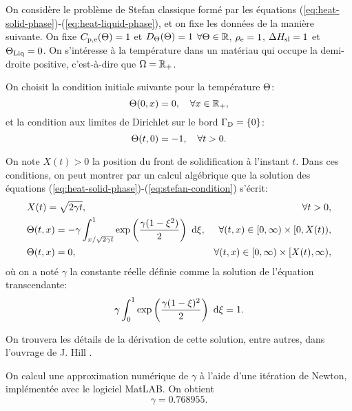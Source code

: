 On considère le problème de Stefan classique formé par les équations
(\ref{eq:heat-solid-phase})-(\ref{eq:heat-liquid-phase}), et on fixe
les données de la manière suivante. On fixe
$C_{\mathrm{p,e}}(\Theta) = 1$ et
$D_\Theta(\Theta)=1$ $\forall\Theta \in \mathbb
R$, $\rho_\mathrm{e} = 1$, $\Delta H_\mathrm{sl} = 1$ et $\Theta_\text{Liq} =
0$. On s'intéresse à la température dans un matériau qui occupe la
demi-droite positive, c'est-à-dire que $\Omega = \mathbb R_+$.

On choisit la condition initiale suivante pour la température
$\Theta$:
\begin{equation}
  \Theta(0, x) = 0, \quad \forall x\in\mathbb R_+,
\end{equation}
et la condition aux limites de Dirichlet sur le bord $\Gamma_\mathrm{D} =
\left\{ 0 \right\}$:
\begin{equation}
  \Theta(t, 0) = -1, \quad \forall t > 0.
\end{equation}

On note $X(t) > 0$ la position du front de solidification à l'instant
$t$. Dans ces conditions, on peut montrer \cite{HillStefanProblems}
par un calcul algébrique que la solution des équations
(\ref{eq:heat-solid-phase})-(\ref{eq:stefan-condition}) s'écrit:
\begin{align}
  & X(t) = \sqrt{2\gamma t},& \forall t > 0,\label{eq:neumann-sol-frontier}\\
  & \temperature(t, x) = -\gamma\int_{x / \sqrt{2\gamma
      t}}^1\exp\parent{\frac{\gamma(1 - \xi^2)}{2}}\, \intd{\xi},%
  & \forall (t, x) \in [0,\infty)\times[0,X(t)),\label{eq:neumann-sol-solid-phase}\\
    & \temperature(t, x) = 0,
    & \forall (t, x) \in [0,\infty)\times[X(t), \infty),\label{eq:neumann-sol-liquid-phase}
\end{align}
où on a noté $\gamma$ la constante réelle définie comme la solution de
l'équation transcendante:
\begin{equation}
  \gamma \int_0^1\exp\left( \frac{\gamma(1 - \xi)^2}{2} \right)\,\,\mathrm d\xi
  = 1.
\end{equation}

On trouvera les détails de la dérivation de cette solution, entre
autres, dans l'ouvrage de J. Hill \cite{HillStefanProblems}.

On calcul une approximation numérique de $\gamma$ à l'aide d'une
itération de Newton, implémentée avec le logiciel MatLAB. On obtient
\begin{equation}\label{eq:gamma}
  \gamma =\num{0.768955}.
\end{equation}

